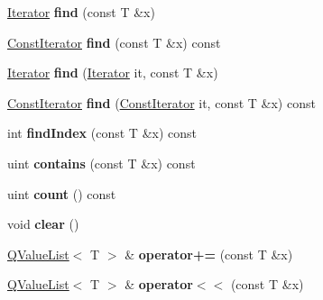 \begin{DoxyCompactItemize}
\item 
\hypertarget{class_q_value_list_ae1bc89258f6f703d69b625ed02bf3323}{\hyperlink{class_q_value_list_a1f559ae0c1d2e8f55846ea5d1ea60977}{Iterator} {\bfseries find} (const T \&x)}\label{class_q_value_list_ae1bc89258f6f703d69b625ed02bf3323}

\item 
\hypertarget{class_q_value_list_a2be444b95436e8d3a33524eacd4d7258}{\hyperlink{class_q_value_list_const_iterator}{Const\-Iterator} {\bfseries find} (const T \&x) const }\label{class_q_value_list_a2be444b95436e8d3a33524eacd4d7258}

\item 
\hypertarget{class_q_value_list_ad37d6dc49f98acd54e3301d1a02597fa}{\hyperlink{class_q_value_list_a1f559ae0c1d2e8f55846ea5d1ea60977}{Iterator} {\bfseries find} (\hyperlink{class_q_value_list_a1f559ae0c1d2e8f55846ea5d1ea60977}{Iterator} it, const T \&x)}\label{class_q_value_list_ad37d6dc49f98acd54e3301d1a02597fa}

\item 
\hypertarget{class_q_value_list_ada13ff79d394c7cb949d4c150469eff3}{\hyperlink{class_q_value_list_const_iterator}{Const\-Iterator} {\bfseries find} (\hyperlink{class_q_value_list_const_iterator}{Const\-Iterator} it, const T \&x) const }\label{class_q_value_list_ada13ff79d394c7cb949d4c150469eff3}

\item 
\hypertarget{class_q_value_list_a377e1eb3b7c9dddccbbc06573151bb60}{int {\bfseries find\-Index} (const T \&x) const }\label{class_q_value_list_a377e1eb3b7c9dddccbbc06573151bb60}

\item 
\hypertarget{class_q_value_list_a92417aaadba244eb74efa684a4bfa07b}{uint {\bfseries contains} (const T \&x) const }\label{class_q_value_list_a92417aaadba244eb74efa684a4bfa07b}

\item 
\hypertarget{class_q_value_list_a774149fc271ebaba2aabcd183a836e8f}{uint {\bfseries count} () const }\label{class_q_value_list_a774149fc271ebaba2aabcd183a836e8f}

\item 
\hypertarget{class_q_value_list_ac8bb3912a3ce86b15842e79d0b421204}{void {\bfseries clear} ()}\label{class_q_value_list_ac8bb3912a3ce86b15842e79d0b421204}

\item 
\hypertarget{class_q_value_list_ac2cbd105a29a4700efaba58bef65711a}{\hyperlink{class_q_value_list}{Q\-Value\-List}$<$ T $>$ \& {\bfseries operator+=} (const T \&x)}\label{class_q_value_list_ac2cbd105a29a4700efaba58bef65711a}

\item 
\hypertarget{class_q_value_list_aeb6d5de30ba31d5dd2a441b68f835a25}{\hyperlink{class_q_value_list}{Q\-Value\-List}$<$ T $>$ \& {\bfseries operator$<$$<$} (const T \&x)}\label{class_q_value_list_aeb6d5de30ba31d5dd2a441b68f835a25}

\end{DoxyCompactItemize}
